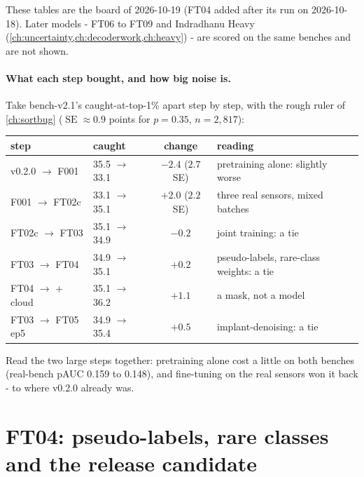 
\begin{drift}
These tables are the board of 2026-10-19 (FT04 added after its run on 2026-10-18). Later models - FT06 to FT09 and
Indradhanu Heavy (\cref{ch:uncertainty,ch:decoderwork,ch:heavy}) - are scored on the same benches and are not shown.
\end{drift}

\paragraph{What each step bought, and how big noise is.} Take bench-v2.1's caught-at-top-1\% apart step by step,
with the rough ruler of \cref{ch:sortbug} ($\operatorname{SE} \approx 0.9$ points for $p = 0.35$, $n = 2{,}817$):
\begin{center}
\small
\begin{tabular}{llcl}
\toprule
step & caught & change & reading \\
\midrule
v0.2.0 $\to$ F001 & 35.5 $\to$ 33.1 & $-2.4$ ($2.7$ SE) & pretraining alone: slightly worse \\
F001 $\to$ FT02c & 33.1 $\to$ 35.1 & $+2.0$ ($2.2$ SE) & three real sensors, mixed batches \\
FT02c $\to$ FT03 & 35.1 $\to$ 34.9 & $-0.2$ & joint training: a tie \\
FT03 $\to$ FT04 & 34.9 $\to$ 35.1 & $+0.2$ & pseudo-labels, rare-class weights: a tie \\
FT04 $\to$ + cloud & 35.1 $\to$ 36.2 & $+1.1$ & a mask, not a model \\
FT03 $\to$ FT05 ep5 & 34.9 $\to$ 35.4 & $+0.5$ & implant-denoising: a tie \\
\bottomrule
\end{tabular}
\end{center}
Read the two large steps together: pretraining alone cost a little on both benches (real-bench pAUC 0.159 to 0.148),
and fine-tuning on the real sensors won it back - to where v0.2.0 already was.

\section{FT04: pseudo-labels, rare classes and the release candidate}\label{sec:ftruns:ft04}

